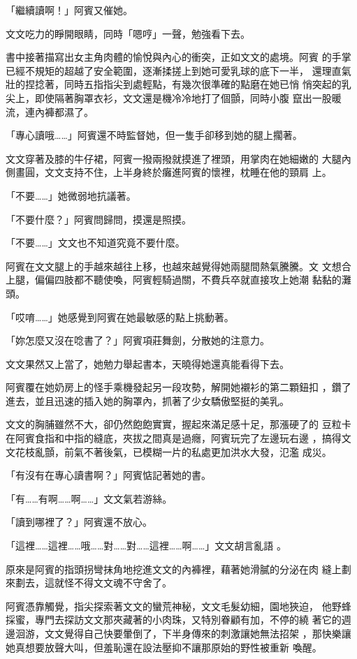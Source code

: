 「繼續讀啊！」阿賓又催她。

文文吃力的睜開眼睛，同時「嗯哼」一聲，勉強看下去。

書中接著描寫出女主角肉體的愉悅與內心的衝突，正如文文的處境。阿賓
的手掌已經不規矩的超越了安全範圍，逐漸揉搓上到她可愛乳球的底下一半，
還理直氣壯的捏捻著，同時五指指尖到處輕點，有幾次很準確的點磨在她已悄
悄突起的乳尖上，即使隔著胸罩衣衫，文文還是機冷冷地打了個顫，同時小腹
竄出一股暖流，連內褲都濕了。

「專心讀哦……」阿賓還不時監督她，但一隻手卻移到她的腿上擱著。

文文穿著及膝的牛仔裙，阿賓一撥兩撥就摸進了裡頭，用掌肉在她細嫩的
大腿內側畫圓，文文支持不住，上半身終於癱進阿賓的懷裡，枕睡在他的頸肩
上。

「不要……」她微弱地抗議著。

「不要什麼？」阿賓問歸問，摸還是照摸。

「不要……」文文也不知道究竟不要什麼。

阿賓在文文腿上的手越來越往上移，也越來越覺得她兩腿間熱氣騰騰。文
文想合上腿，偏偏四肢都不聽使喚，阿賓輕騎過關，不費兵卒就直接攻上她潮
黏黏的灘頭。

「哎唷……」她感覺到阿賓在她最敏感的點上挑動著。

「妳怎麼又沒在唸書了？」阿賓項莊舞劍，分散她的注意力。

文文果然又上當了，她勉力舉起書本，天曉得她還真能看得下去。

阿賓覆在她奶房上的怪手乘機發起另一段攻勢，解開她襯衫的第二顆鈕扣
，鑽了進去，並且迅速的插入她的胸罩內，抓著了少女驕傲堅挺的美乳。

文文的胸脯雖然不大，卻仍然飽飽實實，握起來滿足感十足，那漲硬了的
豆粒卡在阿賓食指和中指的縫底，夾拔之間真是過癮，阿賓玩完了左邊玩右邊
，搞得文文花枝亂顫，前氣不著後氣，已模糊一片的私處更加洪水大發，氾濫
成災。

「有沒有在專心讀書啊？」阿賓惦記著她的書。

「有……有啊……啊……」文文氣若游絲。

「讀到哪裡了？」阿賓還不放心。

「這裡……這裡……哦……對……對……這裡……啊……」文文胡言亂語
。

原來是阿賓的指頭拐彎抹角地挖進文文的內褲裡，藉著她滑膩的分泌在肉
縫上劃來劃去，這就怪不得文文魂不守舍了。

阿賓憑靠觸覺，指尖探索著文文的蠻荒神秘，文文毛髮幼細，園地狹迫，
他野蜂採蜜，專門去探訪文文那夾藏著的小肉珠，又特別眷顧有加，不停的繞
著它的週邊洄游，文文覺得自己快要暈倒了，下半身傳來的刺激讓她無法招架
，那快樂讓她真想要放聲大叫，但羞恥還在設法壓抑不讓那原始的野性被重新
喚醒。

